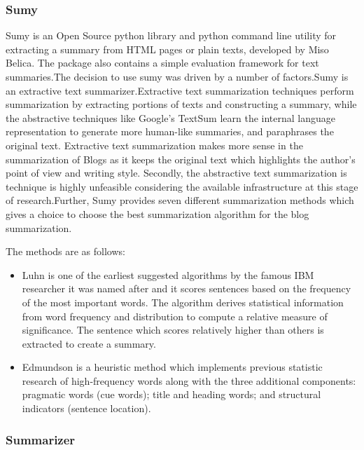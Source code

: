 \subsubsection{Sumy}
Sumy is an Open Source python library and python command line utility for extracting a summary from HTML pages or plain texts, developed by Miso Belica. The package also contains a simple evaluation framework for text summaries.The decision to use sumy was driven by a number of factors.Sumy is an extractive text summarizer.Extractive text summarization techniques perform summarization by extracting portions of texts and constructing a summary, while the abstractive techniques like Google's TextSum learn the internal language representation to generate more human-like summaries,
and paraphrases the original text. Extractive text summarization makes more sense in the summarization of Blogs as it keeps the original text which highlights the author’s point of view and writing style. Secondly, the abstractive text summarization is technique is highly unfeasible considering the available infrastructure at this stage of research.Further, Sumy provides seven different summarization methods which gives a choice to choose the best summarization algorithm for the blog summarization. 

The methods are as follows: 

\begin{itemize}
    \item Luhn is one of the earliest suggested algorithms by the famous IBM researcher it was named after and it scores sentences based on the frequency of the most important words. The algorithm derives statistical information from word frequency and distribution to compute a relative measure of significance. The sentence which scores relatively higher than others is extracted to create a summary. 
    \item Edmundson is a heuristic method which implements previous statistic research of high-frequency words along with the three additional components: pragmatic words (cue words); title and heading words; and structural indicators (sentence location). 
    
\end{itemize}

\subsubsection{Summarizer}

